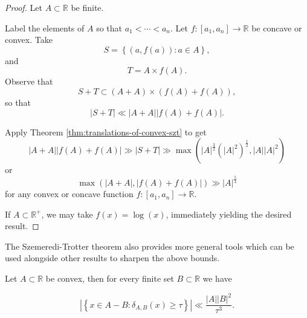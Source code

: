 \documentclass[12pt,reqno]{amsart}
\begin{document}
\begin{proof}
Let \(A \subset \mathbb{R} \) be finite. 

Label the elements of \(A\) so that \(a_1 < \cdots < a_{n} \).
Let \(f : [a_1,a_{n} ] \to \mathbb{R} \) be concave or convex.
Take
\[
    S = \left\{ (a,f(a)) : a \in A \right\} 
,\]
and
\[
    T = A \times f(A)
.\]
Observe that
\[
    S + T \subset \left( A + A \right) \times \left( f(A) + f(A) \right) 
,\]
so that
\[
    \left\lvert S + T \right\rvert \ll \left\lvert A + A \right\rvert \left\lvert f(A) + f(A) \right\rvert
.\]

Apply Theorem \ref{thm:translations-of-convex-szt} to get
\[
    \left\lvert A+A \right\rvert \left\lvert f(A) + f(A) \right\rvert \gg \left\lvert S+T \right\rvert \gg \max \left( \left\lvert A \right\rvert ^{\frac{3}{2} } \left( \left\lvert A \right\rvert ^{2} \right) ^{\frac{1}{2} }, \left\lvert A \right\rvert \left\lvert A \right\rvert ^{2} \right) 
\]
or
\[
    \max \left( \left\lvert A + A \right\rvert , \left\lvert f(A) + f(A) \right\rvert  \right) \gg \left\lvert A \right\rvert ^{\frac{5}{4} }
\]
for any convex or concave function \(f : [a_1,a_{n} ] \to \mathbb{R}\).

If \(A \subset \mathbb{R} ^{+}\), we may take \(f(x) = \log \left( x \right) \), immediately yielding the desired result.
\end{proof}

The Szemeredi-Trotter theorem also provides more general tools which can be
used alongside other results to sharpen the above bounds.

\begin{theorem}\label{thm:shkredov-lemma-szt}

    Let \(A \subset \mathbb{R} \) be convex, then for every 
    finite set \(B \subset \mathbb{R} \) we have

    \[
        \left\lvert \left\{ x \in A-B : \delta_{A,B} (x) \geq \tau \right\}  \right\rvert \ll \frac{\left\lvert A \right\rvert \left\lvert B \right\rvert^{2} }{\tau^{3} }
    .\]
\end{theorem}
\end{document}
